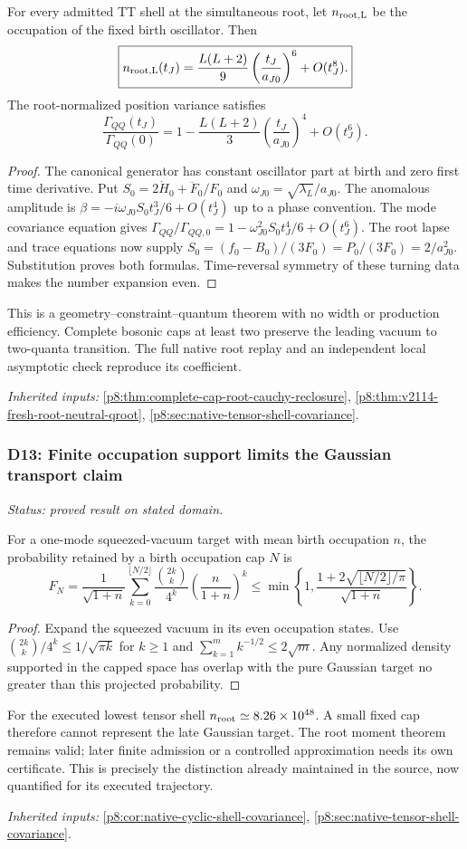 \documentclass[12pt,a4paper]{article}
\begin{document}
For every admitted TT shell at the simultaneous root, let $n_{\rm root,L}$
be the occupation of the fixed birth oscillator. Then
\[
 \boxed{n_{\rm root,L}(t_J)
 =\frac{L(L+2)}9\left(\frac{t_J}{a_{J0}}\right)^6+O(t_J^8).}
\]
The root-normalized position variance satisfies
\[
 \frac{\Gamma_{QQ}(t_J)}{\Gamma_{QQ}(0)}
 =1-\frac{L(L+2)}3\left(\frac{t_J}{a_{J0}}\right)^4+O(t_J^6).
\]
\begin{proof}
The canonical generator has constant oscillator part at birth
and zero first time derivative. Put
$S_0=2\dot H_0+\ddot F_0/F_0$ and $\omega_{J0}=\sqrt{\lambda_L}/a_{J0}$.
The anomalous amplitude is
$\beta=-i\omega_{J0}S_0t_J^3/6+O(t_J^4)$ up to a phase convention.
The mode covariance equation gives
$\Gamma_{QQ}/\Gamma_{QQ,0}=1-\omega_{J0}^2S_0t_J^4/6+O(t_J^6)$.
The root lapse and trace equations now supply
$S_0=(f_0-B_0)/(3F_0)=P_0/(3F_0)=2/a_{J0}^2$.
Substitution proves both formulas. Time-reversal symmetry of these turning
data makes the number expansion even.
\end{proof}
This is a geometry--constraint--quantum theorem with no width or production
efficiency. Complete bosonic caps at least two preserve the leading vacuum
to two-quanta transition. The full native root replay and an independent
local asymptotic check reproduce its coefficient.
\par\noindent\textit{Inherited inputs:} \ref{p8:thm:complete-cap-root-cauchy-reclosure}, \ref{p8:thm:v2114-fresh-root-neutral-qroot}, \ref{p8:sec:native-tensor-shell-covariance}.

\subsubsection{D13: Finite occupation support limits the Gaussian transport claim}
\label{p8:sec:v2201-derived-d13}
\noindent\textit{Status: proved result on stated domain.}

For a one-mode squeezed-vacuum target with mean birth occupation $n$, the
probability retained by a birth occupation cap $N$ is
\[
 F_N=\frac1{\sqrt{1+n}}
 \sum_{k=0}^{\lfloor N/2\rfloor}
 \frac{\binom{2k}k}{4^k}\left(\frac n{1+n}\right)^k
 \le\min\left\{1,\frac{1+2\sqrt{\lfloor N/2\rfloor/\pi}}{\sqrt{1+n}}\right\}.
\]
\begin{proof}
Expand the squeezed vacuum in its even occupation states.
Use $\binom{2k}k/4^k\le1/\sqrt{\pi k}$ for $k\ge1$ and
$\sum_{k=1}^m k^{-1/2}\le2\sqrt m$. Any normalized density supported in
the capped space has overlap with the pure Gaussian target no greater than
this projected probability.
\end{proof}
For the executed lowest tensor shell $n_{\rm root}\simeq8.26\times10^{48}$.
A small fixed cap therefore cannot represent the late Gaussian target.
The root moment theorem remains valid; later finite admission or a controlled
approximation needs its own certificate. This is precisely the distinction
already maintained in the source, now quantified for its executed trajectory.
\par\noindent\textit{Inherited inputs:} \ref{p8:cor:native-cyclic-shell-covariance}, \ref{p8:sec:native-tensor-shell-covariance}.
\end{document}
